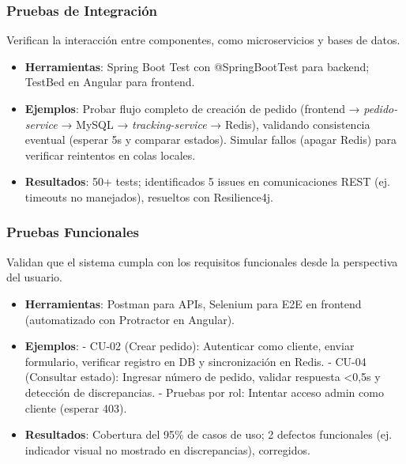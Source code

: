 \documentclass[a4paper,12pt]{article}
\begin{document}
\subsubsection{Pruebas de Integración}
Verifican la interacción entre componentes, como microservicios y bases de datos.
\begin{itemize}
    \item \textbf{Herramientas}: Spring Boot Test con @SpringBootTest para backend; TestBed en Angular para frontend.
    \item \textbf{Ejemplos}: Probar flujo completo de creación de pedido (frontend → \textit{pedido-service} → MySQL → \textit{tracking-service} → Redis), validando consistencia eventual (esperar 5s y comparar estados). Simular fallos (apagar Redis) para verificar reintentos en colas locales.
    \item \textbf{Resultados}: 50+ tests; identificados 5 issues en comunicaciones REST (ej. timeouts no manejados), resueltos con Resilience4j.
\end{itemize}

\subsubsection{Pruebas Funcionales}
Validan que el sistema cumpla con los requisitos funcionales desde la perspectiva del usuario.
\begin{itemize}
    \item \textbf{Herramientas}: Postman para APIs, Selenium para E2E en frontend (automatizado con Protractor en Angular).
    \item \textbf{Ejemplos}: 
        - CU-02 (Crear pedido): Autenticar como cliente, enviar formulario, verificar registro en DB y sincronización en Redis.
        - CU-04 (Consultar estado): Ingresar número de pedido, validar respuesta <0,5s y detección de discrepancias.
        - Pruebas por rol: Intentar acceso admin como cliente (esperar 403).
    \item \textbf{Resultados}: Cobertura del 95\% de casos de uso; 2 defectos funcionales (ej. indicador visual no mostrado en discrepancias), corregidos.
\end{itemize}
\end{document}
